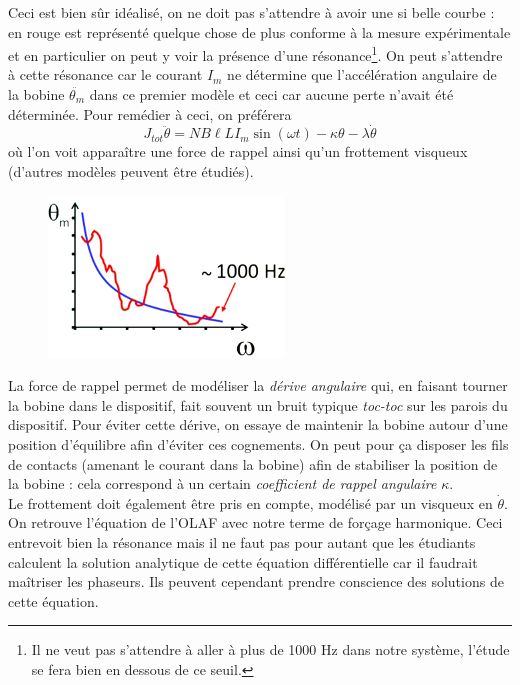 Ceci est bien sûr idéalisé, on ne doit pas s'attendre à avoir une si belle courbe : en rouge est représenté 
quelque chose de plus conforme à la mesure expérimentale et en particulier on peut y voir la présence d'une 
résonance\footnote{Il ne veut pas s'attendre à aller à plus de 1000 Hz dans notre système, l'étude se fera
bien en dessous de ce seuil.}. On peut s'attendre à cette résonance car le courant $I_m$ ne détermine que 
l'accélération angulaire de la bobine $\ddot{\theta_m}$ dans ce premier modèle et ceci car aucune perte 
n'avait été déterminée. Pour remédier à ceci, on préférera 
\begin{equation}
J_{tot} \ddot{\theta} = NB\ell LI_m\sin(\omega t) - \kappa\theta-\lambda\dot{\theta}
\end{equation}
où l'on voit apparaître une force de rappel ainsi qu'un frottement visqueux (d'autres modèles peuvent être
étudiés).\\


\begin{figure}
\vspace{-16mm}
\includegraphics[scale=0.45]{ch1/image3.png}
\end{figure}
 La force de rappel permet de modéliser la \textit{dérive angulaire} qui, en faisant tourner la 
bobine dans le dispositif, fait souvent un bruit typique \textit{toc-toc} sur les parois du dispositif. Pour
éviter cette dérive, on essaye de maintenir la bobine autour d'une position d'équilibre afin d'éviter ces 
cognements. On peut pour ça disposer les fils de contacts (amenant le courant dans la bobine) afin de stabiliser
la position de la bobine : cela correspond à un certain \textit{coefficient de rappel angulaire} $\kappa$.\\

Le frottement doit également être pris en compte, modélisé par un visqueux en $\dot{\theta}$. On retrouve 
l'équation de l'OLAF avec notre terme de forçage harmonique. Ceci entrevoit bien la résonance mais il ne faut
pas pour autant que les étudiants calculent la solution analytique de cette équation différentielle car il 
faudrait maîtriser les phaseurs. Ils peuvent cependant prendre conscience des solutions de cette équation. \\

